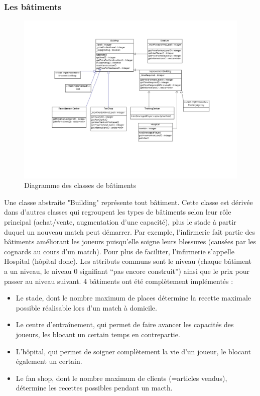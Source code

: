 \documentclass[a4paper,titlepage]{scrreprt}
\begin{document}
  \subsubsection{Les bâtiments}
    \begin{figure}[H]
    \center
    \includegraphics[scale=0.4]{uml/class/Buildings.png}
    \caption{Diagramme des classes de bâtiments}
    \end{figure}	
  Une classe abstraite "Building" représente tout bâtiment. Cette classe est dérivée dans d'autres classes qui regroupent les types de bâtiments selon leur rôle principal (achat/vente, augmentation
  d'une capacité), plus le stade à partir duquel un nouveau match peut démarrer. Par exemple, l'\gls{infirmerie} fait partie des bâtiments améliorant les joueurs puisqu'elle soigne leurs blessures (causées par les cognards au cours d'un match). Pour plus de faciliter, l'infirmerie s'appelle Hospital (hôpital donc).
  Les attributs communs sont le niveau (chaque bâtiment a un niveau, le niveau 0
  signifiant \enquote{pas encore construit}) ainsi que le prix pour passer au niveau suivant.
  4 bâtiments ont été complètement implémentés : 
  \begin{itemize}
  \item Le stade, dont le nombre maximum de places détermine la recette maximale possible réalisable lors d'un match à domicile.
  \item Le centre d'entraînement, qui permet de faire avancer les capacités des joueurs, les blocant un certain temps en contrepartie.
  \item L'hôpital, qui permet de soigner complètement la vie d'un joueur, le blocant également un certain.
  \item Le fan shop, dont le nombre maximum de clients (=articles vendus), détermine les recettes possibles pendant un macth.
  \end{itemize}
\end{document}
